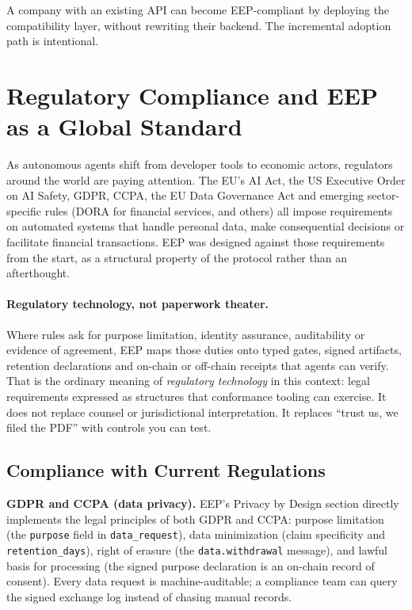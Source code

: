 \documentclass[12pt,a4paper]{article}
\begin{document}
A company with an existing API can become EEP-compliant by deploying the compatibility layer, without rewriting their backend. The incremental adoption path is intentional.

\section{Regulatory Compliance and EEP as a Global Standard}

As autonomous agents shift from developer tools to economic actors, regulators around the world are paying attention. The EU's AI Act, the US Executive Order on AI Safety, GDPR, CCPA, the EU Data Governance Act and emerging sector-specific rules (DORA for financial services, and others) all impose requirements on automated systems that handle personal data, make consequential decisions or facilitate financial transactions. EEP was designed against those requirements from the start, as a structural property of the protocol rather than an afterthought.

\paragraph{Regulatory technology, not paperwork theater.}
Where rules ask for purpose limitation, identity assurance, auditability or evidence of agreement, EEP maps those duties onto typed gates, signed artifacts, retention declarations and on-chain or off-chain receipts that agents can verify. That is the ordinary meaning of \emph{regulatory technology} in this context: legal requirements expressed as structures that conformance tooling can exercise. It does not replace counsel or jurisdictional interpretation. It replaces ``trust us, we filed the PDF'' with controls you can test.

\subsection{Compliance with Current Regulations}

\textbf{GDPR and CCPA (data privacy).}
EEP's Privacy by Design section directly implements the legal principles of both GDPR and CCPA: purpose limitation (the \texttt{purpose} field in \texttt{data\_request}), data minimization (claim specificity and \texttt{retention\_days}), right of erasure (the \texttt{data.withdrawal} message), and lawful basis for processing (the signed purpose declaration is an on-chain record of consent). Every data request is machine-auditable; a compliance team can query the signed exchange log instead of chasing manual records.
\end{document}
